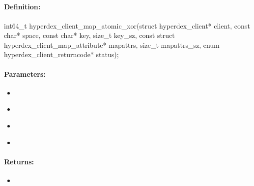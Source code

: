 \pagebreak
\subsection{}
\label{api:c:map_atomic_xor}


\paragraph{Definition:}
\begin{ccode}
int64_t hyperdex_client_map_atomic_xor(struct hyperdex_client* client,
        const char* space,
        const char* key, size_t key_sz,
        const struct hyperdex_client_map_attribute* mapattrs, size_t mapattrs_sz,
        enum hyperdex_client_returncode* status);
\end{ccode}

\paragraph{Parameters:}
\begin{itemize}[noitemsep]
\item {}\\

\item {}\\

\item {}\\

\item {}\\

\end{itemize}

\paragraph{Returns:}
\begin{itemize}[noitemsep]
\item {}\\

\end{itemize}

